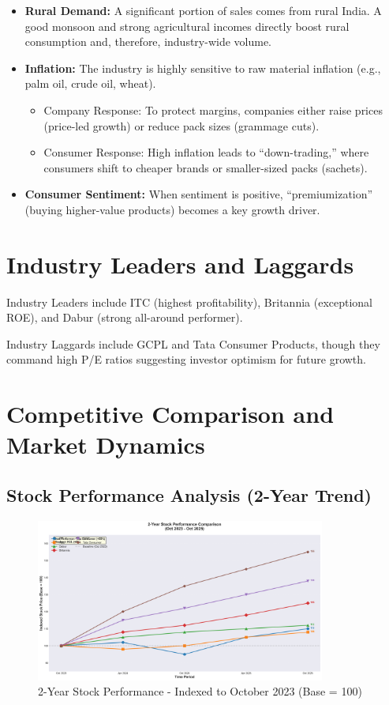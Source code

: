 \documentclass[12pt, a4paper]{report}
\begin{document}
\begin{itemize}
    \item \textbf{Rural Demand:} A significant portion of sales comes from rural India. A good monsoon and strong agricultural incomes directly boost rural consumption and, therefore, industry-wide volume.
    
    \item \textbf{Inflation:} The industry is highly sensitive to raw material inflation (e.g., palm oil, crude oil, wheat).
    \begin{itemize}
        \item Company Response: To protect margins, companies either raise prices (price-led growth) or reduce pack sizes (grammage cuts).
        \item Consumer Response: High inflation leads to ``down-trading,'' where consumers shift to cheaper brands or smaller-sized packs (sachets).
    \end{itemize}
    
    \item \textbf{Consumer Sentiment:} When sentiment is positive, ``premiumization'' (buying higher-value products) becomes a key growth driver.
\end{itemize}

\section{Industry Leaders and Laggards}

Industry Leaders include ITC (highest profitability), Britannia (exceptional ROE), and Dabur (strong all-around performer).

Industry Laggards include GCPL and Tata Consumer Products, though they command high P/E ratios suggesting investor optimism for future growth.

\section{Competitive Comparison and Market Dynamics}

\subsection{Stock Performance Analysis (2-Year Trend)}

\begin{figure}[H]
    \centering
    \includegraphics[width=0.85\textwidth]{assets/industry_profile /stock_performance_chart.png}
    \caption{2-Year Stock Performance - Indexed to October 2023 (Base = 100)}
\end{figure}
\end{document}
